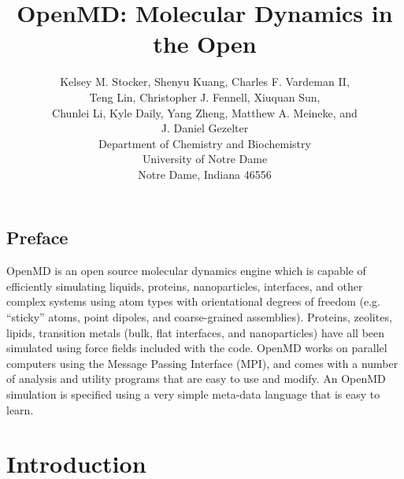 \documentclass[]{book}
\begin{document}




\title{{\sc OpenMD}: Molecular Dynamics in the Open}

\author{Kelsey M. Stocker, Shenyu Kuang, Charles F. Vardeman II, \\
  Teng Lin, Christopher J. Fennell,  Xiuquan Sun, \\
  Chunlei Li, Kyle Daily, Yang Zheng, Matthew A. Meineke, and \\
  J. Daniel Gezelter \\
  Department of Chemistry and Biochemistry\\
  University of Notre Dame\\
  Notre Dame, Indiana 46556}

\maketitle

\section*{Preface}
{\sc OpenMD} is an open source molecular dynamics engine which is capable of
efficiently simulating liquids, proteins, nanoparticles, interfaces,
and other complex systems using atom types with orientational degrees
of freedom (e.g. ``sticky'' atoms, point dipoles, and coarse-grained
assemblies). Proteins, zeolites, lipids, transition metals (bulk, flat
interfaces, and nanoparticles) have all been simulated using force
fields included with the code. {\sc OpenMD} works on parallel computers
using the Message Passing Interface (MPI), and comes with a number of
analysis and utility programs that are easy to use and modify. An
OpenMD simulation is specified using a very simple meta-data language
that is easy to learn.

\tableofcontents
\listoffigures
\listoftables
 
\mainmatter

\chapter{\label{sec:intro}Introduction}
\end{document}
